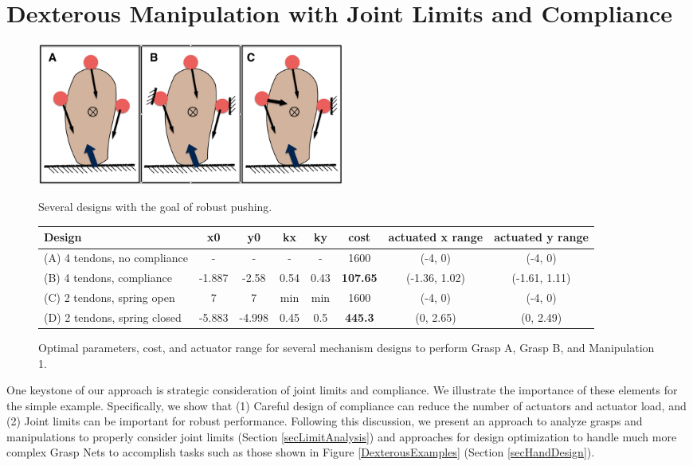 \section{Dexterous Manipulation with Joint Limits and Compliance}
  \label{secManipAnalysis}

\begin{figure}
\begin{center}
{\includegraphics[width=4in]{./figs/pushExample.png}}
\end{center}
\caption[]{Several designs with the goal of robust pushing.}
\label{PushExample}
\end{figure}

\begin{figure}
\begin{center}
\begin{tabular}{l|c|c|c|c|c|c|c|}
Design & x0 & y0 & kx & ky & cost &	actuated x range &	actuated y range \\ \hline
(A) 4 tendons, no compliance&	-&	-&	-&	-&	1600	&(-4, 0)	&(-4, 0)\\
(B) 4 tendons, compliance	&-1.887	&-2.58	&0.54&	0.43&	{\bf 107.65} &	(-1.36, 1.02)	&(-1.61, 1.11) \\
(C) 2 tendons, spring open&	7	&7	&min	&min	&1600	&(-4, 0)	&(-4, 0)\\
(D) 2 tendons, spring closed&	-5.883&	-4.998&	0.45&	0.5	& {\bf 445.3}  &	(0, 2.65)&	(0, 2.49)
\end{tabular}
\end{center}
\caption{Optimal parameters, cost, and actuator range for several mechanism designs to perform Grasp A, Grasp B, and Manipulation 1.}
\label{ComplianceAnalysis}
\end{figure}

One keystone of our approach is strategic consideration of joint limits and compliance.  We illustrate the importance of these elements for the simple example.  Specifically, we show that (1) Careful design of compliance can reduce the number of actuators and actuator load, and (2) Joint limits can be important for robust performance.   Following this discussion, we present an approach to analyze grasps and manipulations to properly consider joint limits (Section \ref{secLimitAnalysis}) and approaches for design optimization to handle much more complex Grasp Nets to accomplish tasks such as those shown in Figure \ref{DexterousExamples} (Section \ref{secHandDesign}).

